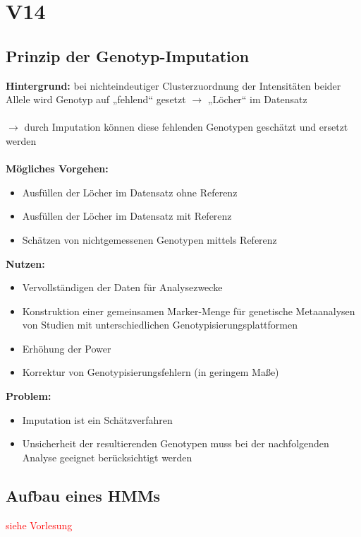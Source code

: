 \section{V14}
\subsection{Prinzip der Genotyp-Imputation}
\textbf{Hintergrund:} bei nichteindeutiger Clusterzuordnung der Intensitäten beider Allele wird Genotyp auf „fehlend“ gesetzt $\rightarrow$ „Löcher“ im Datensatz\\\\
$\rightarrow$ durch Imputation können diese fehlenden Genotypen geschätzt und ersetzt werden\\\\
\textbf{Mögliches Vorgehen:}
\begin{itemize}
	\item Ausfüllen der Löcher im Datensatz ohne Referenz
	\item Ausfüllen der Löcher im Datensatz mit Referenz
	\item Schätzen von nichtgemessenen Genotypen mittels Referenz
\end{itemize}

\textbf{Nutzen:}
\begin{itemize}
	\item Vervollständigen der Daten für Analysezwecke
	\item Konstruktion einer gemeinsamen Marker-Menge für genetische Metaanalysen von Studien mit unterschiedlichen Genotypisierungsplattformen
	\item Erhöhung der Power
	\item Korrektur von Genotypisierungsfehlern (in geringem Maße)
\end{itemize}

\textbf{Problem:}
\begin{itemize}
	\item Imputation ist ein Schätzverfahren
	\item Unsicherheit der resultierenden Genotypen muss bei der nachfolgenden Analyse geeignet berücksichtigt werden
\end{itemize}

\subsection{Aufbau eines HMMs}
\textcolor{red}{siehe Vorlesung}

\newpage
